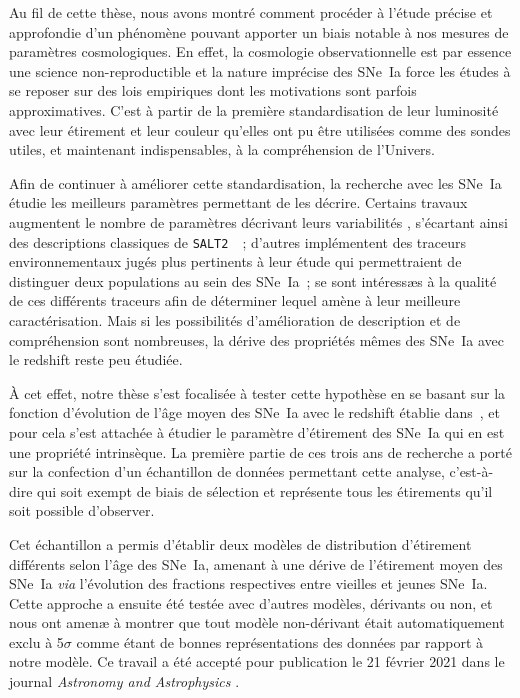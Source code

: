 \documentclass[../main/main.tex]{subfiles}
\begin{document}


Au fil de cette thèse, nous avons montré comment procéder à l'étude précise et
approfondie d'un phénomène pouvant apporter un biais notable à nos mesures de
paramètres cosmologiques. En effet, la cosmologie observationnelle est par
essence une science non-reproductible et la nature imprécise des SNe~Ia force
les études à se reposer sur des lois empiriques dont les motivations sont
parfois approximatives. C'est à partir de la première standardisation de leur
luminosité avec leur étirement et leur couleur qu'elles ont pu être utilisées
comme des sondes utiles, et maintenant indispensables, à la compréhension de
l'Univers.

Afin de continuer à améliorer cette standardisation, la recherche avec les
SNe~Ia étudie les meilleurs paramètres permettant de les décrire. Certains
travaux augmentent le nombre de paramètres décrivant leurs variabilités
\citep[c'est le cas de SUGAR, décrit dans][]{leget2020}, s'écartant ainsi des
descriptions classiques de \texttt{SALT2}~\citep{guy2007}~; d'autres
implémentent des traceurs environnementaux jugés plus pertinents à leur étude
\citep[par exemple, le LsSFR dans][ou la masse de la galaxie hôte
dans~\citet{childress2013}]{rigault2013} qui permettraient de distinguer deux
populations au sein des SNe~Ia~; \cite{briday2022} se sont intéressæs à la
qualité de ces différents traceurs afin de déterminer lequel amène à leur
meilleure caractérisation. Mais si les possibilités d'amélioration de
description et de compréhension sont nombreuses, la dérive des propriétés mêmes
des SNe~Ia avec le redshift reste peu étudiée.

À cet effet, notre thèse s'est focalisée à tester cette hypothèse en se basant
sur la fonction d'évolution de l'âge moyen des SNe~Ia avec le redshift établie
dans~\cite{rigault2020}, et pour cela s'est attachée à étudier le paramètre
d'étirement des SNe~Ia qui en est une propriété intrinsèque. La première partie
de ces trois ans de recherche a porté sur la confection d'un échantillon de
données permettant cette analyse, c'est-à-dire qui soit exempt de biais de
sélection et représente tous les étirements qu'il soit possible d'observer.

Cet échantillon a permis d'établir deux modèles de distribution d'étirement
différents selon l'âge des SNe~Ia, amenant à une dérive de l'étirement moyen des
SNe~Ia \textit{via} l'évolution des fractions respectives entre vieilles et
jeunes SNe~Ia. Cette approche a ensuite été testée avec d'autres modèles,
dérivants ou non, et nous ont amenæ à montrer que tout modèle non-dérivant était
automatiquement exclu à 5$\sigma$ comme étant de bonnes représentations des
données par rapport à notre modèle. Ce travail a été accepté pour publication le
21 février 2021 dans le journal \textit{Astronomy and Astrophysics}
\citep{nicolas2021}.
\end{document}
